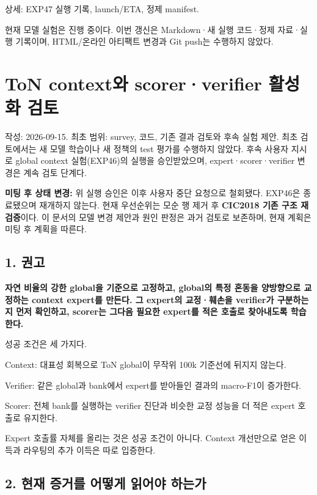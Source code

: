 상세: EXP47 실행 기록, launch/\allowbreak{}ETA, 정제 manifest.

현재 모델 실험은 진행 중이다. 이번 갱신은 Markdown·새 실행 코드·정제 자료·실행 기록이며, HTML/\allowbreak{}온라인 아티팩트 변경과 Git push는 수행하지 않았다.



\section{ToN context와 scorer·verifier 활성화 검토}
작성: 2026-09-15. 최초 범위: survey, 코드, 기존 결과 검토와 후속 실험 제안. 최초 검토에서는 새 모델 학습이나 새 정책의 test 평가를 수행하지 않았다. 후속 사용자 지시로 global context 실험(EXP46)의 실행을 승인받았으며, expert·scorer·verifier 변경은 계속 검토 단계다.

\textbf{미팅 후 상태 변경:} 위 실행 승인은 이후 사용자 중단 요청으로 철회됐다. EXP46은 종료됐으며 재개하지 않는다. 현재 우선순위는 모순 행 제거 후 \textbf{CIC2018 기존 구조 재검증}이다. 이 문서의 모델 변경 제안과 원인 판정은 과거 검토로 보존하며, 현재 계획은 미팅 후 계획을 따른다.



\subsection{1. 권고}
\textbf{자연 비율의 강한 global을 기준으로 고정하고, global의 특정 혼동을 양방향으로 교정하는 context expert를 만든다. 그 expert의 교정·훼손을 verifier가 구분하는지 먼저 확인하고, scorer는 그다음 필요한 expert를 적은 호출로 찾아내도록 학습한다.}

성공 조건은 세 가지다.

\par\noindent \textbullet\enspace Context: 대표성 회복으로 ToN global이 무작위 100k 기준선에 뒤지지 않는다.


\par\noindent \textbullet\enspace Verifier: 같은 global과 bank에서 expert를 받아들인 결과의 macro-F1이 증가한다.


\par\noindent \textbullet\enspace Scorer: 전체 bank를 실행하는 verifier 진단과 비슷한 교정 성능을 더 적은 expert 호출로 유지한다.


Expert 호출률 자체를 올리는 것은 성공 조건이 아니다. Context 개선만으로 얻은 이득과 라우팅의 추가 이득은 따로 입증한다.

\subsection{2. 현재 증거를 어떻게 읽어야 하는가}
